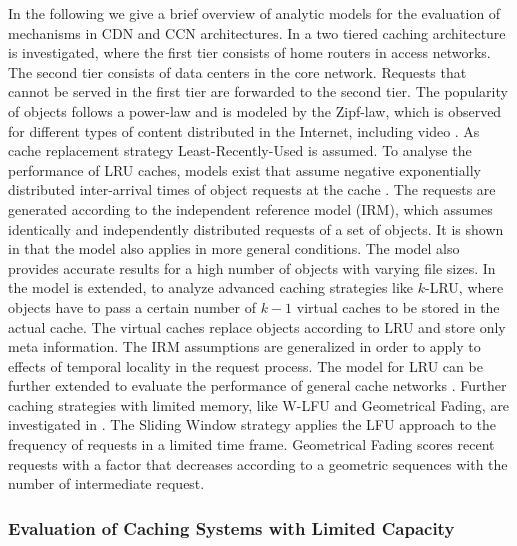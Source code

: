 In the following we give a brief overview of analytic models for the evaluation of mechanisms in CDN and CCN architectures.
In \cite{fricker2012impact} a two tiered caching architecture is investigated, where the first tier consists of home routers in access networks.
The second tier consists of data centers in the core network.
Requests that cannot be served in the first tier are forwarded to the second tier.
The popularity of objects follows a power-law and is modeled by the Zipf-law, which is observed for different types of content distributed in the Internet, including video \cite{gill2007youtube,cha2009analyzing}.
As cache replacement strategy Least-Recently-Used is assumed.
To analyse the performance of LRU caches, models exist that assume negative exponentially distributed inter-arrival times of object requests at the cache \cite{che2002hierarchical}.
The requests are generated according to the independent reference model (IRM), which assumes identically and independently distributed requests of a set of objects.
It is shown in \cite{fricker2012versatile} that the model also applies in more general conditions.
The model also provides accurate results for a high number of objects with varying file sizes.
In \cite{martina2014unified} the model is extended, to analyze advanced caching strategies like {$k$-LRU}, where objects have to pass a certain number of $k-1$ virtual caches to be stored in the actual cache.
The virtual caches replace objects according to LRU and store only meta information.
The IRM assumptions are generalized in order to apply to effects of temporal locality in the request process.
The model for LRU can be further extended to evaluate the performance of general cache networks \cite{rosensweig2010approximate, martina2014unified}.
Further caching strategies with limited memory, like W-LFU and Geometrical Fading, are investigated in \cite{hasslinger2014caching}.
The Sliding Window strategy applies the LFU approach to the frequency of requests in a limited time frame.
Geometrical Fading scores recent requests with a factor that decreases according to a geometric sequences with the number of intermediate request.

\subsubsection{Evaluation of Caching Systems with Limited Capacity}

